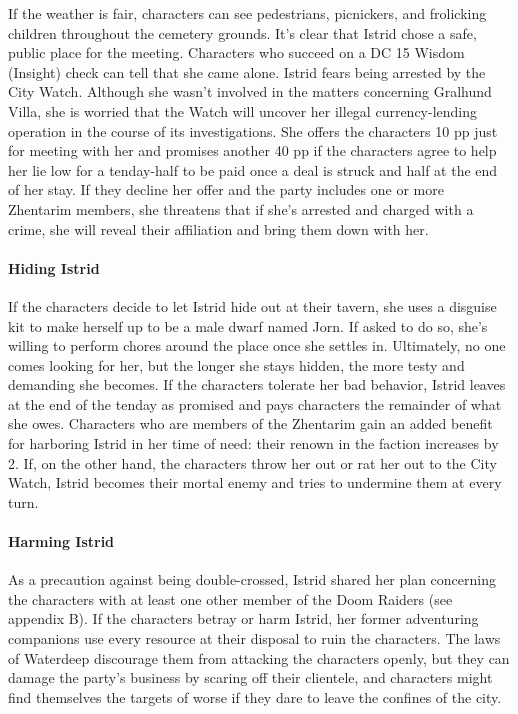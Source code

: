 \documentclass[10pt,a4paper,twoside,twocolumn,openany,nodeprecatedcode]{dndbook}
\begin{document}
If the weather is fair, characters can see pedestrians, picnickers, and frolicking children throughout the cemetery grounds. It's clear that Istrid chose a safe, public place for the meeting. Characters who succeed on a DC 15 Wisdom (Insight) check can tell that she came alone.
Istrid fears being arrested by the City Watch. Although she wasn't involved in the matters concerning Gralhund Villa, she is worried that the Watch will uncover her illegal currency-lending operation in the course of its investigations. She offers the characters 10 pp just for meeting with her and promises another 40 pp if the characters agree to help her lie low for a tenday-half to be paid once a deal is struck and half at the end of her stay. If they decline her offer and the party includes one or more Zhentarim members, she threatens that if she's arrested and charged with a crime, she will reveal their affiliation and bring them down with her.
\paragraph{Hiding Istrid}
If the characters decide to let Istrid hide out at their tavern, she uses a disguise kit to make herself up to be a male dwarf named Jorn. If asked to do so, she's willing to perform chores around the place once she settles in. Ultimately, no one comes looking for her, but the longer she stays hidden, the more testy and demanding she becomes.
If the characters tolerate her bad behavior, Istrid leaves at the end of the tenday as promised and pays characters the remainder of what she owes. Characters who are members of the Zhentarim gain an added benefit for harboring Istrid in her time of need: their renown in the faction increases by 2.
If, on the other hand, the characters throw her out or rat her out to the City Watch, Istrid becomes their mortal enemy and tries to undermine them at every turn.
\paragraph{Harming Istrid}
As a precaution against being double-crossed, Istrid shared her plan concerning the characters with at least one other member of the Doom Raiders (see appendix B). If the characters betray or harm Istrid, her former adventuring companions use every resource at their disposal to ruin the characters. The laws of Waterdeep discourage them from attacking the characters openly, but they can damage the party's business by scaring off their clientele, and characters might find themselves the targets of worse if they dare to leave the confines of the city.
\end{document}
